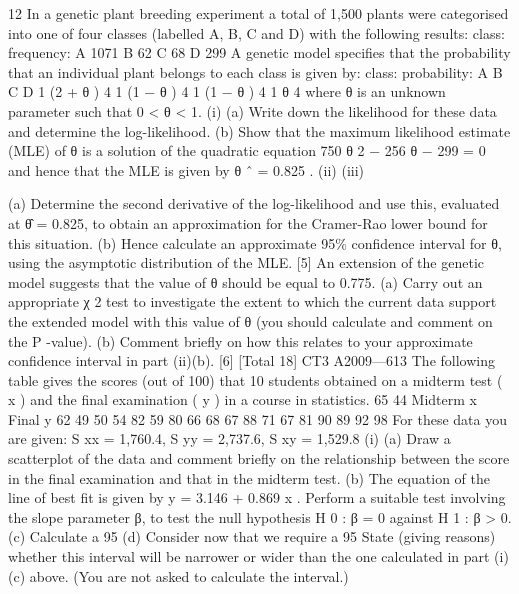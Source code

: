 \documentclass[a4paper,12pt]{article}
\begin{document}
\begin{enumerate}

12
In a genetic plant breeding experiment a total of 1,500 plants were categorised into
one of four classes (labelled A, B, C and D) with the following results:
class:
frequency:
A
1071
B
62
C
68
D
299
A genetic model specifies that the probability that an individual plant belongs to each
class is given by:
class:
probability:
A B C D
1
(2 + θ )
4 1
(1 − θ )
4 1
(1 − θ )
4 1
θ
4
where θ is an unknown parameter such that 0 < θ < 1.
(i)
(a) Write down the likelihood for these data and determine the log-likelihood.
(b) Show that the maximum likelihood estimate (MLE) of θ is a solution of the quadratic equation
750 θ 2 − 256 θ − 299 = 0
and hence that the MLE is given by θ ˆ = 0.825 .
(ii)
(iii)

(a) Determine the second derivative of the log-likelihood and use this, evaluated at θ̂ = 0.825, to obtain an approximation for the Cramer-Rao
lower bound for this situation.
(b) Hence calculate an approximate 95\% confidence interval for θ, using the asymptotic distribution of the MLE.
[5]
An extension of the genetic model suggests that the value of θ should be equal to 0.775.
(a) Carry out an appropriate χ 2 test to investigate the extent to which the current data support the extended model with this value of θ (you should calculate and comment on the P -value).
(b) Comment briefly on how this relates to your approximate confidence interval in part (ii)(b).
[6]
[Total 18]
CT3 A2009—613
The following table gives the scores (out of 100) that 10 students obtained on a midterm test ( x ) and the final examination ( y ) in a course in statistics.
65
44
Midterm x
Final y
62
49
50
54
82
59
80
66
68
67
88
71
67
81
90
89
92
98
For these data you are given: S xx = 1,760.4, S yy = 2,737.6, S xy = 1,529.8
(i)
(a) Draw a scatterplot of the data and comment briefly on the relationship between the score in the final examination and that in the midterm test.
(b) The equation of the line of best fit is given by y = 3.146 + 0.869 x . Perform a suitable test involving the slope parameter β, to test the null hypothesis H 0 : β = 0 against H 1 : β > 0.
(c) Calculate a 95%
(d) Consider now that we require a 95%
State (giving reasons) whether this interval will be narrower or wider than the one calculated in part (i)(c) above. (You are not asked to calculate the interval.)

\end{enumerate}
\end{document}
